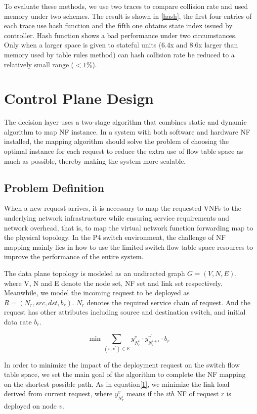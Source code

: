 \documentclass[10pt, conference, letterpaper]{IEEEtran}
\begin{document}
To evaluate these methods, we use two traces to compare collision rate and used memory under two schemes. The result is shown in \ref{hash}, the first four entries of each trace use hash function and the fifth one obtains state index issued by controller. 
Hash function shows a bad performance under two circumstances. Only when a larger space is given to stateful units (6.4x and 8.6x larger than memory used by table rules method) can hash collision rate be reduced to a relatively small range ($<1\%$).



\section{Control Plane Design}
The decision layer uses a two-stage algorithm that combines static and dynamic algorithm to map NF instance. In a system with both software and hardware NF installed, the mapping algorithm should solve the problem of choosing the optimal instance for each request to reduce the extra use of flow table space as much as possible, thereby making the system more scalable.
\subsection{Problem Definition}
When a new request arrives, it is necessary to map the requested VNFs to the underlying network infrastructure while ensuring service requirements and network overhead, that is, to map the virtual network function forwarding map to the physical topology. In the P4 switch environment, the challenge of NF mapping mainly lies in how to use the limited switch flow table space resources to improve the performance of the entire system.

The data plane topology is modeled as an undirected graph $G=(V, N, E)$, where V, N and E denote the node set, NF set and link set respectively. Meanwhile, we model the incoming request to be deployed as $R=(N_r, src, dst, b_r)$. $N_r$ denotes the required service chain of request. And the request has other attributes including source and destination switch, and initial data rate $b_r$. 

\begin{equation}
\min \sum_{(v, v^{\prime}) \in E} y_{N_{r}^{i}}^{v} \cdot y_{N_{r}^{i+1}}^{v^{\prime}} \cdot b_r \label{1}
\end{equation}

In order to minimize the impact of the deployment request on the switch flow table space, we set the main goal of the algorithm to complete the NF mapping on the shortest possible path. As in equation\eqref{1}, we minimize the link load derived from current request, where $y_{N_{r}^{i}}^{v}$ means if the $ith$ NF of request $r$ is deployed on node $v$.
\end{document}
